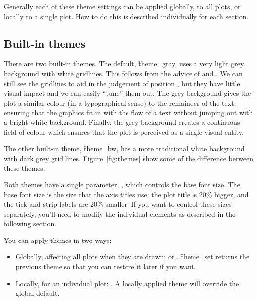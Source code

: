 \noindent Generally each of these theme settings can be applied globally, to all plots, or locally to a single plot.  How to do this is described individually for each section.

\subsection{Built-in themes}
\label{sec:built_in}

There are two built-in themes.  The default, \f{theme_gray}, uses a very light grey background with white gridlines.  This follows from the advice of \citet{tufte:2006,tufte:1990,tufte:2001,tufte:1997} and \citet{brewer:1994,carr:2002,carr:1994,carr:1999}. We can still see the gridlines to aid in the judgement of position \citep{cleveland:1993a}, but they have little visual impact and we can easily ``tune'' them out. The grey background gives the plot a similar colour (in a typographical sense) to the remainder of the text, ensuring that the graphics fit in with the flow of a text without jumping out with a bright white background. Finally, the grey background creates a continuous field of colour which ensures that the plot is perceived as a single visual entity. 

The other built-in theme, \f{theme_bw}, has a more traditional white background with dark grey grid lines.  Figure~\ref{fig:themes} show some of the difference between these themes.

Both themes have a single parameter, , which controls the base font size.  The base font size is the size that the axis titles use: the plot title is 20\% bigger, and the tick and strip labels are 20\% smaller.  If you want to control these sizes separately, you'll need to modify the individual elements as described in the following section.

You can apply themes in two ways:

\begin{itemize}
  \item Globally, affecting all plots when they are drawn:  or .  \f{theme_set} returns the previous theme so that you can restore it later if you want.
  
  \item Locally, for an individual plot:  .  A locally applied theme will override the global default.
\end{itemize}

